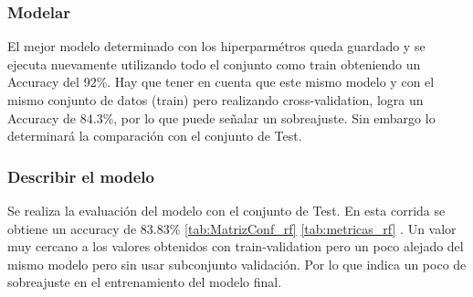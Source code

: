 \subsubsection{Modelar}
El mejor modelo determinado con los hiperparmétros queda guardado y se ejecuta nuevamente utilizando todo el conjunto como train obteniendo un Accuracy del 92\%. Hay que tener en cuenta que este mismo modelo y con el mismo conjunto de datos (train) pero realizando cross-validation, logra un Accuracy de 84.3\%, por lo que puede señalar un sobreajuste. Sin embargo lo determinará la comparación con el conjunto de Test. \\

%	





\subsubsection{Describir el modelo}

Se realiza la evaluación del modelo con el conjunto de Test. En esta
corrida se obtiene un accuracy de 83.83\% \ref{tab:MatrizConf_rf} \ref{tab:metricas_rf} . Un valor muy cercano a los valores obtenidos con train-validation pero un poco alejado del mismo modelo pero sin usar subconjunto validación. Por lo que indica un poco de sobreajuste en el entrenamiento del modelo final.\\


